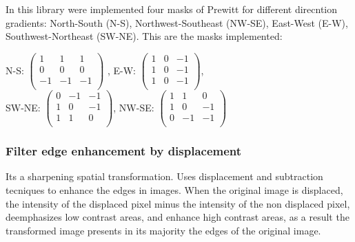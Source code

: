 \documentclass[a4paper]{article}
\begin{document}
In this library were implemented four masks of Prewitt for different direcntion  gradients: North-South (N-S), Northwest-Southeast (NW-SE), East-West (E-W), Southwest-Northeast (SW-NE). This are the masks implemented: \\
\begin{center}
N-S: \begin{math}
   \begin{pmatrix} 
   1 & 1 & 1 \\ 
   0 & 0 & 0 \\
   -1 & -1 & -1 \\ 
   \end{pmatrix}
\end{math} , E-W:
\begin{math}
   \begin{pmatrix} 
   1 & 0 & -1 \\ 
   1 & 0 & -1 \\
   1 & 0 & -1 \\ 
   \end{pmatrix}
\end{math},  \\ SW-NE: \begin{math}
   \begin{pmatrix} 
   0 & -1 & -1 \\ 
   1 & 0 & -1 \\
   1 & 1 & 0 \\ 
   \end{pmatrix}
\end{math},  NW-SE: \begin{math}
   \begin{pmatrix} 
   1 &1 & 0 \\ 
   1 & 0 & -1 \\
   0 & -1 & -1 \\ 
   \end{pmatrix}
\end{math}\\
\end{center}

\subsubsection{Filter edge enhancement by displacement}

Its a sharpening spatial transformation. Uses displacement and subtraction tecniques to enhance the edges in images. When the original image is displaced, the intensity of the displaced pixel minus the intensity of the non displaced pixel, deemphasizes low contrast areas, and enhance high contrast areas, as a result the transformed image presents  in its majority the edges of the original image.
\end{document}
